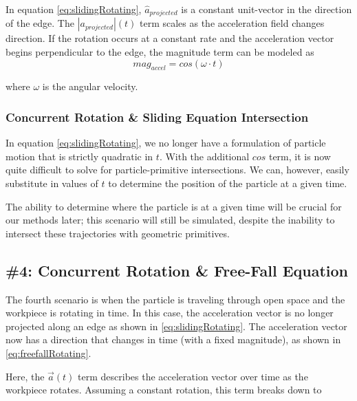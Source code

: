  {
	\label{eq:slidingRotating}
}

In equation \eqref{eq:slidingRotating}, $\hat{a}_{projected}$ is a constant unit-vector in the direction of the edge. The $|a_{projected}|(t)$ term scales as the acceleration field changes direction. If the rotation occurs at a constant rate and the acceleration vector begins perpendicular to the edge, the magnitude term can be modeled as
$$
mag_{accel} = cos(\omega \cdot t)
$$

where $\omega$ is the angular velocity.

		\subsubsection{Concurrent Rotation \& Sliding Equation Intersection}

In equation \eqref{eq:slidingRotating}, we no longer have a formulation of particle motion that is strictly quadratic in $t$. With the additional $cos$ term, it is now quite difficult to solve for particle-primitive intersections. We can, however, easily substitute in values of $t$ to determine the position of the particle at a given time.

The ability to determine where the particle is at a given time will be crucial for our methods later; this scenario will still be simulated, despite the inability to intersect these trajectories with geometric primitives.

		\subsection{\#4: Concurrent Rotation \& Free-Fall Equation}

The fourth scenario is when the particle is traveling through open space and the workpiece is rotating in time. In this case, the acceleration vector is no longer projected along an edge as shown in \eqref{eq:slidingRotating}. The acceleration vector now has a direction that changes in time (with a fixed magnitude), as shown in \eqref{eq:freefallRotating}.

 {
	\label{eq:freefallRotating}
}

Here, the $\vec{a}(t)$ term describes the acceleration vector over time as the workpiece rotates. Assuming a constant rotation, this term breaks down to

